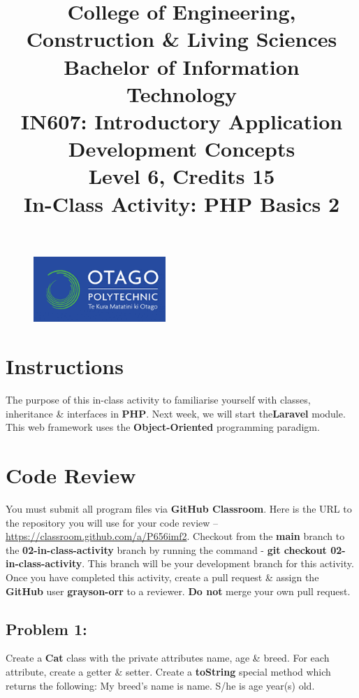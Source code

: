 \documentclass{article}
\author{}
\begin{document}
\begin{figure}
    \centering
    \includegraphics[width=50mm]{../img/logo.png}
\end{figure}

\title{College of Engineering, Construction \& Living Sciences\\Bachelor of Information Technology\\IN607: Introductory Application Development Concepts\\Level 6, Credits 15\\\textbf{In-Class Activity: PHP Basics 2}}
\date{}
\maketitle
 
\section*{Instructions}
The purpose of this in-class activity to familiarise yourself with classes, inheritance \& interfaces in \textbf{PHP}. Next week, we will start the\textbf{Laravel} module. This web framework uses the \textbf{Object-Oriented} programming paradigm.

\section*{Code Review}
You must submit all program files via \textbf{GitHub Classroom}. Here is the URL to the repository you will use for your code review – \href{https://classroom.github.com/a/P656imf2}{https://classroom.github.com/a/P656imf2}. Checkout from the \textbf{main} branch to the \textbf{02-in-class-activity} branch by running the command - \textbf{git checkout 02-in-class-activity}. This branch will be your development branch for this activity. Once you have completed this activity, create a pull request \& assign the \textbf{GitHub} user \textbf{grayson-orr} to a reviewer. \textbf{Do not} merge your own pull request.

\subsection*{Problem 1:} 
Create a \textbf{Cat} class with the private attributes name, age & breed. For each attribute, create a getter & setter. Create a \textbf{toString} special method which returns the following: My breed's name is name. S/he is age year(s) old.
\end{document}
